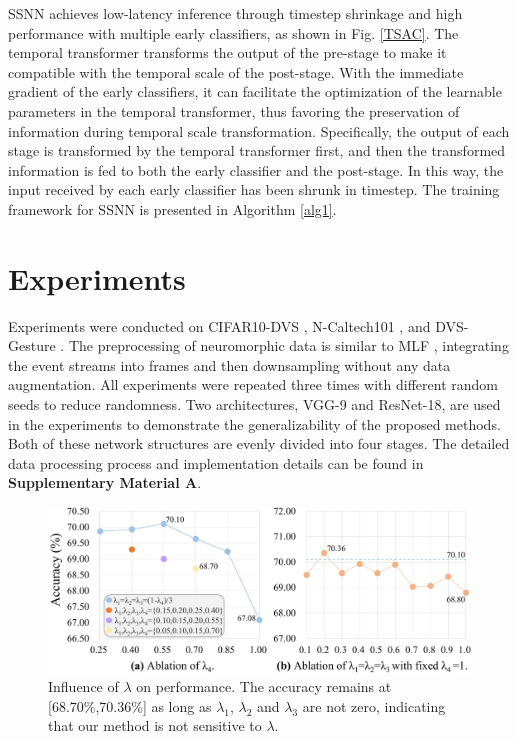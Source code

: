 \documentclass[letterpaper]{article} %
\begin{document}
SSNN achieves low-latency inference through timestep shrinkage and high performance with multiple early classifiers, as shown in Fig. \ref{TSAC}. The temporal transformer transforms the output of the pre-stage to make it compatible with the temporal scale of the post-stage. With the immediate gradient of the early classifiers, it can facilitate the optimization of the learnable parameters in the temporal transformer, thus favoring the preservation of information during temporal scale transformation. Specifically, the output of each stage is transformed by the temporal transformer first, and then the transformed information is fed to both the early classifier and the post-stage. In this way, the input received by each early classifier has been shrunk in timestep. The training framework for SSNN is presented in Algorithm \ref{alg1}.




\section{Experiments}
\label{Experiments}
Experiments were conducted on CIFAR10-DVS \cite{CIFAR10-DVS}, N-Caltech101 \cite{N-Caltech101}, and DVS-Gesture \cite{DVS-Gesture}. The preprocessing of neuromorphic data is similar to MLF \cite{MLF}, integrating the event streams into frames and then downsampling without any data augmentation. All experiments were repeated three times with different random seeds to reduce randomness. Two architectures, VGG-9 and ResNet-18, are used in the experiments to demonstrate the generalizability of the proposed methods. Both of these network structures are evenly divided into four stages. The detailed data processing process and implementation details can be found in \textbf{Supplementary Material A}.
\begin{figure}[!tb]
\centering
\includegraphics[width=0.98\columnwidth]{lambda.pdf}
\caption{Influence of $\lambda$ on performance. The accuracy remains at [68.70\%,70.36\%] as long as $\lambda_1$, $\lambda_2$ and $\lambda_3$ are not zero, indicating that our method is not sensitive to $\lambda$.}
\label{lambda}
\end{figure}
\end{document}
